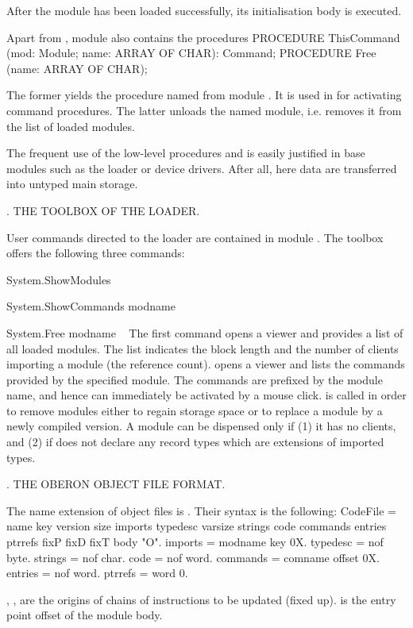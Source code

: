 \noindent After the module has been loaded successfully, its initialisation body is executed.

Apart from , module  also contains the procedures
\begintt
PROCEDURE ThisCommand (mod: Module; name: ARRAY OF CHAR): Command;
PROCEDURE Free (name: ARRAY OF CHAR);
\endtt

\noindent The former yields the procedure named  from module . It is used in  for activating command procedures. The latter unloads the named module, i.e. removes it from the list of loaded modules.

The frequent use of the low-level procedures  and  is easily justified in base modules such as the loader or device drivers. After all, here data are transferred into untyped main storage.

. THE TOOLBOX OF THE LOADER.

User commands directed to the loader are contained in module . The toolbox offers the following three commands:
\smallskip
\item{} System.ShowModules
\item{} System.ShowCommands modname
\item{} System.Free {modname} ~
\smallskip
\noindent The first command opens a viewer and provides a list of all loaded modules. The list indicates the block length and the number of clients importing a module (the reference count).  opens a viewer and lists the commands provided by the specified module. The commands are prefixed by the module name, and hence can immediately be activated by a mouse click.  is called in order to remove modules either to regain storage space or to replace a module by a newly compiled version. A module can be dispensed only if (1) it has no clients, and (2) if does not declare any record types which are extensions of imported types.

. THE OBERON OBJECT FILE FORMAT.

The name extension of object files is . Their syntax is the following:
\begintt
CodeFile = name key version size
imports typedesc varsize strings code commands entries ptrrefs fixP fixD fixT body "O".
imports = {modname key} 0X.
typedesc = nof {byte}.
strings = nof {char}.
code = nof {word}.
commands = {comname offset} 0X.
entries = nof {word}.
ptrrefs = {word} 0.
\endtt

\noindent {}, ,  are the origins of chains of instructions to be updated (fixed up).  is the entry point offset of the module body.

